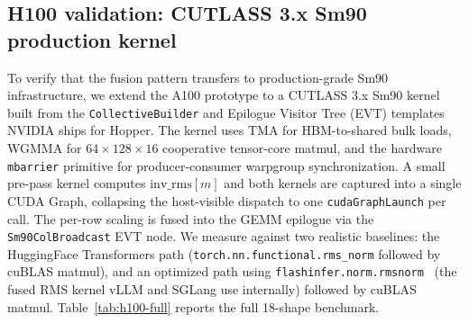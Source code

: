 \documentclass{article}
\begin{document}
\subsection{H100 validation: CUTLASS 3.x Sm90 production kernel}\label{app:h100-cutlass}

To verify that the fusion pattern transfers to production-grade Sm90 infrastructure, we extend the A100 prototype to a CUTLASS 3.x Sm90 kernel built from the \texttt{CollectiveBuilder} and Epilogue Visitor Tree (EVT) templates NVIDIA ships for Hopper. The kernel uses TMA for HBM-to-shared bulk loads, WGMMA for $64{\times}128{\times}16$ cooperative tensor-core matmul, and the hardware \texttt{mbarrier} primitive for producer-consumer warpgroup synchronization. A small pre-pass kernel computes $\mathrm{inv\_rms}[m]$ and both kernels are captured into a single CUDA Graph, collapsing the host-visible dispatch to one \texttt{cudaGraphLaunch} per call. The per-row scaling is fused into the GEMM epilogue via the \texttt{Sm90ColBroadcast} EVT node. We measure against two realistic baselines: the HuggingFace Transformers path (\texttt{torch.nn.functional.rms\_norm} followed by cuBLAS matmul), and an optimized path using \texttt{flashinfer.norm.rmsnorm}~\citep{flashInfer} (the fused RMS kernel vLLM and SGLang use internally) followed by cuBLAS matmul. Table~\ref{tab:h100-full} reports the full 18-shape benchmark.
\end{document}
